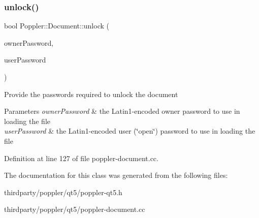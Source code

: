 \subsubsection{\texorpdfstring{unlock()}{unlock()}}
{\footnotesize\ttfamily bool Poppler\+::\+Document\+::unlock (\begin{DoxyParamCaption}\item[{const Q\+Byte\+Array \&}]{owner\+Password,  }\item[{const Q\+Byte\+Array \&}]{user\+Password }\end{DoxyParamCaption})}

Provide the passwords required to unlock the document


\begin{DoxyParams}{Parameters}
{\em owner\+Password} & the Latin1-\/encoded owner password to use in loading the file \\
\hline
{\em user\+Password} & the Latin1-\/encoded user (\char`\"{}open\char`\"{}) password to use in loading the file \\
\hline
\end{DoxyParams}


Definition at line 127 of file poppler-\/document.\+cc.



The documentation for this class was generated from the following files\+:\begin{DoxyCompactItemize}
\item 
thirdparty/poppler/qt5/poppler-\/qt5.\+h\item 
thirdparty/poppler/qt5/poppler-\/document.\+cc\end{DoxyCompactItemize}
